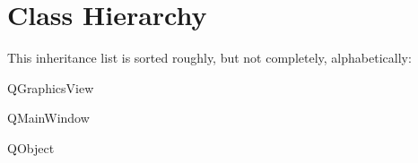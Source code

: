 \section{Class Hierarchy}
This inheritance list is sorted roughly, but not completely, alphabetically\+:\begin{DoxyCompactList}
\item Q\+Graphics\+View\begin{DoxyCompactList}
\item {}
\end{DoxyCompactList}
\item Q\+Main\+Window\begin{DoxyCompactList}
\item {}
\end{DoxyCompactList}
\item Q\+Object\begin{DoxyCompactList}
\item {}
\end{DoxyCompactList}
\end{DoxyCompactList}
